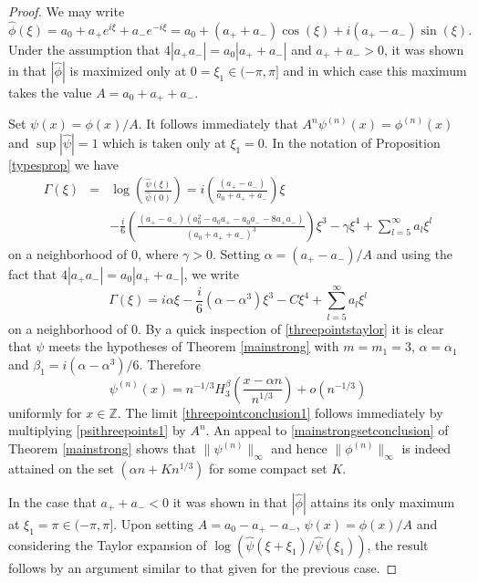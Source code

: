 \documentclass{article}
\theoremstyle{theorem}
\theoremstyle{remark}
\begin{document}
\begin{proof}
We may write
\begin{equation*}
\hat{\phi}(\xi)=a_0+a_{+}e^{i\xi}+a_{-}e^{-i\xi}=a_0+ (a_{+}+a_{-})\cos(\xi)+i(a_{+}-a_{-})\sin(\xi).
\end{equation*}
Under the assumption that $4|a_{+}a_{-}|=a_0|a_{+}+a_{-}|$ and $a_{+}+a_{-}>0$, it was shown in \cite{DSC1} that $|\hat{\phi}|$ is maximized only at $0=\xi_1\in(-\pi,\pi]$ and in which case this maximum takes the value $A=a_0+a_{+} +a_{-}$. 

Set $\psi(x)=\phi(x)/A$. It follows immediately that $A^n\psi^{(n)}(x)=\phi^{(n)}(x)$ and $\sup|\hat{\psi}|=1$ which is taken only at $\xi_1=0$. In the notation of Proposition \ref{typesprop} we have
\begin{eqnarray*}
\Gamma(\xi)&=&\log\left(\frac{\hat{\psi}(\xi)}{\hat{\psi}(0)}\right)=i\left(\frac{(a_{+}-a_{-})}{a_0+a_{+}+a_{-}}\right)\xi\\
&&-\frac{i}{6}\left(\frac{(a_{+}-a_{-})(a_{0}^2-a_0 a_{+}-a_0 a_{-}-8a_{+}a_{-})}{(a_0+a_{+}+a_{-})^3}\right)\xi^3
-\gamma\xi^4+\sum_{l=5}^{\infty}a_l\xi^l
\end{eqnarray*}
on a neighborhood of $0$, where $\gamma>0$. Setting $\alpha=(a_{+}-a_{-})/A$ and using the fact that $4|a_{+}a_{-}|=a_0|a_{+}+a_{-}|$, we write
\begin{equation}\label{threepointstaylor}
\Gamma(\xi)=i\alpha\xi-\frac{i}{6}(\alpha-\alpha^3)\xi^3-C\xi^4+\sum_{l=5}^{\infty}a_l\xi^l
\end{equation}
on a neighborhood of $0$.  By a quick inspection of \eqref{threepointstaylor} it is clear that $\psi$ meets the hypotheses of Theorem \ref{mainstrong} with $m=m_1=3$, $\alpha=\alpha_1$ and $\beta_1=i(\alpha-\alpha^3)/6$. Therefore
\begin{equation}\label{psithreepoints1}
\psi^{(n)}(x)=n^{-1/3}H_3^{\beta}\left(\frac{x-\alpha n}{n^{1/3}}\right)+o(n^{-1/3})
\end{equation}
uniformly for $x\in \mathbb{Z}$. The limit \eqref{threepointconclusion1} follows immediately by multiplying \eqref{psithreepoints1} by $A^n$. An appeal to \eqref{mainstrongsetconclusion} of Theorem \ref{mainstrong} shows that $\|\psi^{(n)}\|_{\infty}$ and hence $\|\phi^{(n)}\|_{\infty}$ is indeed attained on the set $(\alpha n+Kn^{1/3})$ for some compact set $K$.

In the case that $a_{+}+a_{-}<0$ it was shown in \cite{DSC1} that $|\hat{\phi}|$ attains its only maximum at $\xi_1=\pi\in(-\pi,\pi]$. Upon setting $A=a_0-a_{+} -a_{-}$, $\psi(x)=\phi(x)/A$ and considering the Taylor expansion of $\log(\hat{\psi}(\xi+\xi_1)/\hat{\psi}(\xi_1))$, the result follows by an argument similar to that given for the previous case.
\end{proof}
\end{document}
